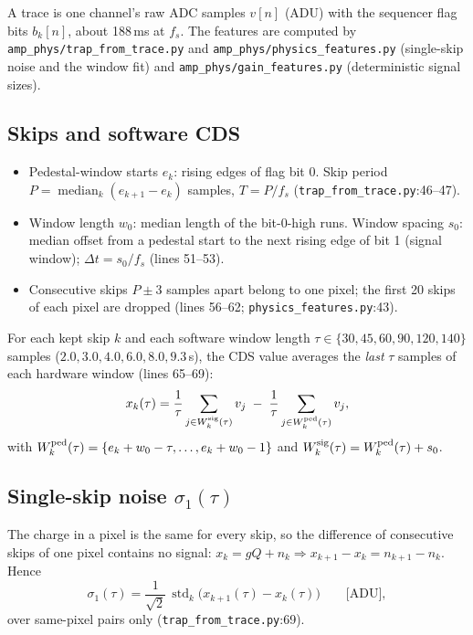 \documentclass[10pt,a4paper]{article}
\newcommand{\code}[1]{\texttt{\small #1}}
\newcommand{\std}{\operatorname{std}}
\newcommand{\med}{\operatorname{median}}
\begin{document}
A trace is one channel's raw ADC samples $v[n]$ (ADU) with the sequencer flag bits $b_k[n]$, about 188\,ms at $f_s$.
The features are computed by \code{amp\_phys/trap\_from\_trace.py} and \code{amp\_phys/physics\_features.py}
(single-skip noise and the window fit) and \code{amp\_phys/gain\_features.py} (deterministic signal sizes).

\subsection{Skips and software CDS}
\begin{itemize}
\item Pedestal-window starts $e_k$: rising edges of flag bit 0. Skip period $P=\med_k(e_{k+1}-e_k)$ samples,
  $T=P/f_s$ (\code{trap\_from\_trace.py}:46--47).
\item Window length $w_0$: median length of the bit-0-high runs. Window spacing $s_0$: median offset from a pedestal start
  to the next rising edge of bit 1 (signal window); $\Delta t=s_0/f_s$ (lines 51--53).
\item Consecutive skips $P\pm3$ samples apart belong to one pixel; the first 20 skips of each pixel are dropped
  (lines 56--62; \code{physics\_features.py}:43).
\end{itemize}
For each kept skip $k$ and each software window length $\tau\in\{30,45,60,90,120,140\}$ samples
($2.0, 3.0, 4.0, 6.0, 8.0, 9.3$\,\textmu s), the CDS value averages the \emph{last} $\tau$ samples of each hardware window
(lines 65--69):
\begin{equation}
x_k(\tau)=\frac1\tau\sum_{j\in W^{\rm sig}_k(\tau)}v_j\;-\;\frac1\tau\sum_{j\in W^{\rm ped}_k(\tau)}v_j,
\end{equation}
with $W^{\rm ped}_k(\tau)=\{e_k+w_0-\tau,\dots,e_k+w_0-1\}$ and $W^{\rm sig}_k(\tau)=W^{\rm ped}_k(\tau)+s_0$.

\subsection{Single-skip noise $\sigma_1(\tau)$}
The charge in a pixel is the same for every skip, so the difference of consecutive skips of one pixel contains no signal:
$x_k=gQ+n_k\Rightarrow x_{k+1}-x_k=n_{k+1}-n_k$. Hence
\begin{equation}
\sigma_1(\tau)=\frac{1}{\sqrt2}\,\std_k\big(x_{k+1}(\tau)-x_k(\tau)\big)\qquad\text{[ADU]},
\end{equation}
over same-pixel pairs only (\code{trap\_from\_trace.py}:69).
\end{document}
